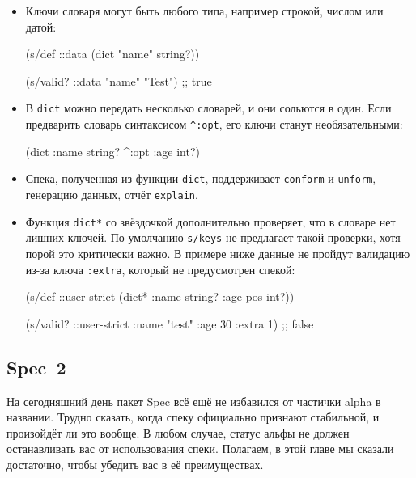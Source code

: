 \begin{itemize}

\item
  Ключи словаря могут быть любого типа, например строкой, числом или датой:

\begin{english}
  \begin{clojure}
(s/def ::data (dict {"name" string?}))

(s/valid? ::data {"name" "Test"})
;; true
  \end{clojure}
\end{english}

\item
  В \verb|dict| можно передать несколько словарей, и они сольются в один. Если
  предварить словарь синтаксисом \verb|^:opt|, его ключи станут необязательными:

\begin{english}
  \begin{clojure}
(dict {:name string?} ^:opt {:age int?})
  \end{clojure}
\end{english}

\item
  Спека, полученная из функции \verb|dict|, поддерживает \verb|conform| и \verb|unform|,
  генерацию данных, отчёт \verb|explain|.

\item
  Функция \verb|dict*| со звёздочкой дополнительно проверяет, что в словаре нет
  лишних ключей. По умолчанию \verb|s/keys| не предлагает такой проверки, хотя
  порой это критически важно. В примере ниже данные не пройдут валидацию из-за
  ключа \verb|:extra|, который не предусмотрен спекой:

\begin{english}
  \begin{clojure}
(s/def ::user-strict
  (dict* {:name string? :age pos-int?}))

(s/valid? ::user-strict
          {:name "test" :age 30 :extra 1})
;; false
  \end{clojure}
\end{english}

\end{itemize}

\subsection{Spec~2}

На сегодняшний день пакет Spec всё ещё не избавился от частички alpha в
названии. Трудно сказать, когда спеку официально признают стабильной, и
произойдёт ли это вообще. В любом случае, статус альфы не должен останавливать
вас от использования спеки. Полагаем, в этой главе мы сказали достаточно, чтобы
убедить вас в её преимуществах.

